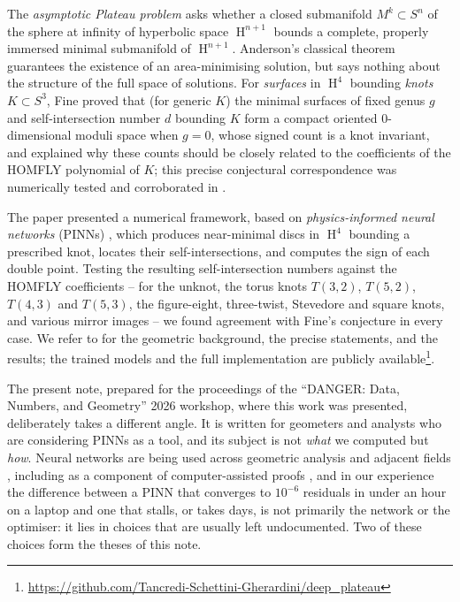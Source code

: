 \documentclass[oneside,british]{amsart}
\numberwithin{equation}{section}
\numberwithin{figure}{section}
\theoremstyle{plain}
\numberwithin{thm}{section}
\theoremstyle{plain}
\theoremstyle{plain}
\theoremstyle{definition}
\theoremstyle{remark}
\DeclareMathOperator{\HH}{\mathrm{H}}
\begin{document}
The \emph{asymptotic Plateau problem} asks whether a closed submanifold
$M^{k}\subset S^{n}$ of the sphere at infinity of hyperbolic space
$\HH^{n+1}$ bounds a complete, properly immersed minimal submanifold of
$\HH^{n+1}$. Anderson's classical theorem \cite{AndersonPlateau}
guarantees the existence of an area-minimising solution, but says
nothing about the structure of the full space of solutions. For
\emph{surfaces} in $\HH^{4}$ bounding \emph{knots} $K\subset S^{3}$,
Fine \cite{FineKnots} proved that (for generic $K$) the minimal
surfaces of fixed genus $g$ and self-intersection number $d$ bounding
$K$ form a compact oriented $0$-dimensional moduli space when $g=0$,
whose signed count is a knot invariant, and explained why these counts
should be closely related to the coefficients of the HOMFLY polynomial
\cite{HOMFLY} of $K$; this precise conjectural correspondence was 
numerically tested and corroborated in \cite{SchettiniUsula2026}.

The paper presented a numerical framework,
based on \emph{physics-informed neural networks} (PINNs)
\cite{raissi2017physicsinformeddeeplearning}, which produces
near-minimal discs in $\HH^{4}$ bounding a prescribed knot,
locates their self-intersections, and computes the sign of each double
point. Testing the resulting self-intersection numbers against the
HOMFLY coefficients -- for the unknot, the torus knots $T(3,2)$,
$T(5,2)$, $T(4,3)$ and $T(5,3)$, the figure-eight, three-twist,
Stevedore and square knots, and various mirror images -- we found
agreement with Fine's conjecture in every case. We
refer to \cite{SchettiniUsula2026} for the geometric background, the
precise statements, and the results; the trained models and the full
implementation are publicly available\footnote{\url{https://github.com/Tancredi-Schettini-Gherardini/deep_plateau}}.

The present note, prepared for the proceedings of the ``DANGER: Data, Numbers, and Geometry'' 
2026 workshop, where this work was presented, deliberately takes a different angle. It
is written for geometers and analysts who are considering PINNs as a
tool, and its subject is not \emph{what} we computed but \emph{how}.
Neural networks are being used across geometric analysis and adjacent
fields
\cite{cortes2026machinelearningapproachnirenberg,platt2026nonuniquenesssymmetriesnirenbergproblem,Hirst2025AInstein,HalversonRuehle2023MetricFlows,hirst2026minimisingwillmoreenergyneural,ZhouYe2023MinimalSurfacePINN,Hashimoto2025PINNMinimal},
including as a component of computer-assisted proofs
\cite{gomez2019computer,wang2025discoveryunstablesingularities}, and in
our experience the difference between a PINN that converges to
$10^{-6}$ residuals in under an hour on a laptop and one that stalls,
or takes days, is not primarily the network or the optimiser: it lies
in choices that are usually left undocumented. Two of these choices
form the theses of this note.
\end{document}

